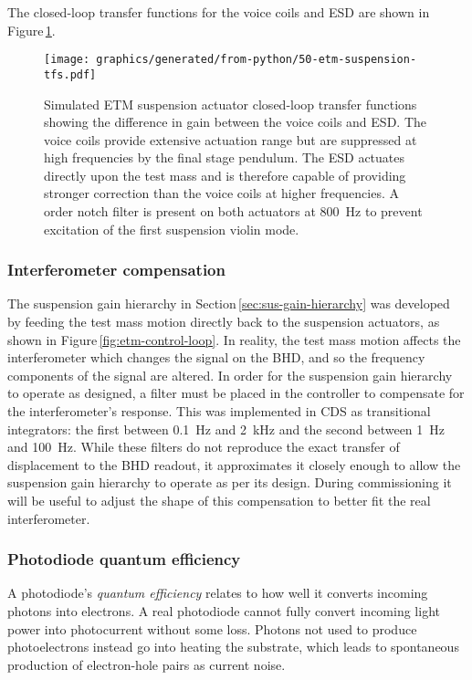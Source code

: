 The closed-loop transfer functions for the voice coils and \gls{ESD} are shown in Figure\,\ref{fig:suspension-crossover}.

\begin{figure}
  \texttt{[image: graphics/generated/from-python/50-etm-suspension-tfs.pdf]}
  \caption[Simulated end test mass suspension actuator closed loop transfer functions]{\label{fig:suspension-crossover}Simulated \SSMEXPT{} ETM suspension actuator closed-loop transfer functions showing the difference in gain between the voice coils and \gls{ESD}. The voice coils provide extensive actuation range but are suppressed at high frequencies by the final stage pendulum. The \gls{ESD} actuates directly upon the test mass and is therefore capable of providing stronger correction than the voice coils at higher frequencies. A  order notch filter is present on both actuators at \SI{800}{\hertz} to prevent excitation of the first suspension violin mode.}
\end{figure}

\subsubsection{\label{sec:ifo-compensation}Interferometer compensation}
The suspension gain hierarchy in Section\,\ref{sec:sus-gain-hierarchy} was developed by feeding the test mass motion directly back to the suspension actuators, as shown in Figure\,\ref{fig:etm-control-loop}. In reality, the test mass motion affects the interferometer which changes the signal on the \gls{BHD}, and so the frequency components of the signal are altered. In order for the suspension gain hierarchy to operate as designed, a filter must be placed in the controller to compensate for the interferometer's response. This was implemented in \gls{CDS} as transitional integrators: the first between \SI{0.1}{\hertz} and \SI{2}{\kilo\hertz} and the second between \SI{1}{\hertz} and \SI{100}{\hertz}. While these filters do not reproduce the exact transfer of \LMINUS{} displacement to the \gls{BHD} readout, it approximates it closely enough to allow the suspension gain hierarchy to operate as per its design. During commissioning it will be useful to adjust the shape of this compensation to better fit the real interferometer.

\subsubsection{Photodiode quantum efficiency}
A photodiode's \emph{quantum efficiency} relates to how well it converts incoming photons into electrons. A real photodiode cannot fully convert incoming light power into photocurrent without some loss. Photons not used to produce photoelectrons instead go into heating the substrate, which leads to spontaneous production of electron-hole pairs as current noise.

